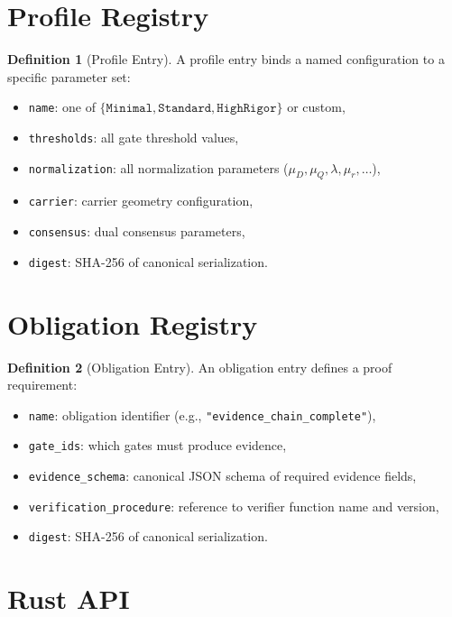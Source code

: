 \documentclass[11pt,a4paper,twoside]{article}
\theoremstyle{definition}
\newtheorem{definition}{Definition}[section]
\theoremstyle{plain}
\theoremstyle{remark}
\begin{document}
\section{Profile Registry}\label{sec:reg:profile}

\begin{definition}[Profile Entry]\label{def:profentry}
A profile entry binds a named configuration to a specific parameter set:
\begin{itemize}[nosep]
  \item \texttt{name}: one of $\{\texttt{Minimal}, \texttt{Standard},
        \texttt{HighRigor}\}$ or custom,
  \item \texttt{thresholds}: all gate threshold values,
  \item \texttt{normalization}: all normalization parameters
        ($\mu_D, \mu_Q, \lambda, \mu_r, \ldots$),
  \item \texttt{carrier}: carrier geometry configuration,
  \item \texttt{consensus}: dual consensus parameters,
  \item \texttt{digest}: SHA-256 of canonical serialization.
\end{itemize}
\end{definition}

\section{Obligation Registry}\label{sec:reg:obligation}

\begin{definition}[Obligation Entry]\label{def:oblentry}
An obligation entry defines a proof requirement:
\begin{itemize}[nosep]
  \item \texttt{name}: obligation identifier (e.g.,
        \texttt{"evidence\_chain\_complete"}),
  \item \texttt{gate\_ids}: which gates must produce evidence,
  \item \texttt{evidence\_schema}: canonical JSON schema of required
        evidence fields,
  \item \texttt{verification\_procedure}: reference to verifier function
        name and version,
  \item \texttt{digest}: SHA-256 of canonical serialization.
\end{itemize}
\end{definition}

\section{Rust API}\label{sec:reg:api}
\end{document}
